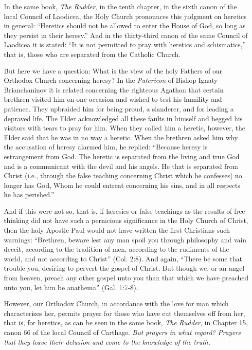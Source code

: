In the same book, \textit{The Rudder}, in the tenth chapter, in the sixth canon of the local Council of Laodicea, the Holy Church pronounces this judgment on heretics in general: “Heretics should not be allowed to enter the House of God, so long as they persist in their heresy.” And in the thirty-third canon of the same Council of Laodicea it is stated: “It is not permitted to pray with heretics and schismatics,” that is, those who are separated from the Catholic Church.

But here we have a question: What is the view of the holy Fathers of our Orthodox Church concerning heresy? In the \textit{Patericon} of Bishop Ignaty Brianchaninov it is related concerning the righteous Agathon that certain brethren visited him on one occasion and wished to test his humility and patience. They upbraided him for being proud, a slanderer, and for leading a depraved life. The Elder acknowledged all these faults in himself and begged his visitors with tears to pray for him. When they called him a heretic, however, the Elder said that he was in no way a heretic. When the brethren asked him why the accusation of heresy alarmed him, he replied: “Because heresy is estrangement from God. The heretic is separated from the living and true God and is a communicant with the devil and his angels. He that is separated from Christ (i.e., through the false teaching concerning Christ which he confesses) no longer has God, Whom he could entreat concerning his sins, and in all respects he has perished.”

And if this were not so, that is, if heresies or false teachings as the results of free thinking did not have such a pernicious significance in the Holy Church of Christ, then the holy Apostle Paul would not have written the first Christians such warnings: “Brethren, beware lest any man spoil you through philosophy and vain deceit, according to the tradition of men, according to the rudiments of the world, and not according to Christ” (Col. 2:8). And again, “There be some that trouble you, desiring to pervert the gospel of Christ. But though we, or an angel from heaven, preach any other gospel unto you than that which we have preached unto you, let him be anathema” (Gal. 1:7-8).

However, our Orthodox Church, in accordance with the love for man which characterizes her, permits prayer for those who have cut themselves off from her, that is, for heretics, as can be seen in the same book, \textit{The Rudder}, in Chapter 15, canon 66 of the local Council of Carthage. \textit{But prayers in what regard? Prayers that they leave their delusion and come to the knowledge of the truth.}

